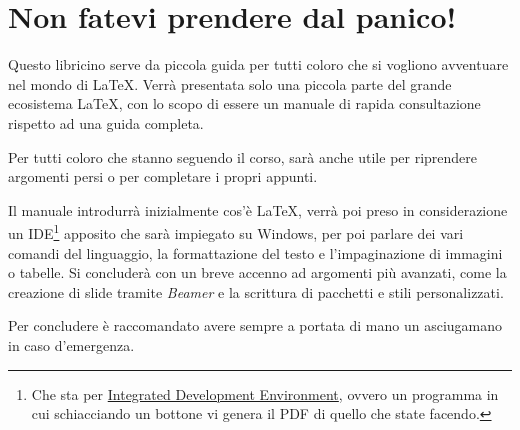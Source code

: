 \chapter*{Non fatevi prendere dal panico!}

Questo libricino serve da piccola guida per tutti coloro che si vogliono 
avventuare nel mondo di \LaTeX. Verrà presentata solo una piccola parte del 
grande ecosistema \LaTeX, con lo scopo di essere un manuale di rapida 
consultazione rispetto ad una guida completa.

Per tutti coloro che stanno seguendo il corso, sarà anche utile per riprendere 
argomenti persi o per completare i propri appunti.

Il manuale introdurrà inizialmente cos'è \LaTeX{}, verrà poi preso in 
considerazione un IDE\footnote{Che sta per 
\href{https://it.wikipedia.org/wiki/Integrated_development_environment}{ 
Integrated Development Environment}, ovvero un programma in cui schiacciando 
un bottone vi genera il PDF di quello che state facendo.} apposito che sarà 
impiegato su Windows, per poi parlare dei vari comandi del linguaggio, la 
formattazione del testo e l'impaginazione di immagini o tabelle. Si concluderà 
con un breve accenno ad argomenti più avanzati, come la creazione di slide 
tramite \textit{Beamer} e la scrittura di pacchetti e stili personalizzati.

Per concludere è raccomandato avere sempre a portata di mano un asciugamano in 
caso d'emergenza.